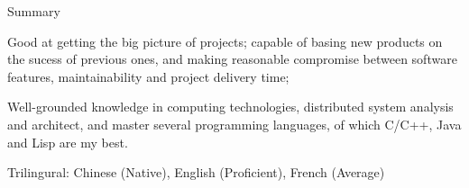 \documentclass{resume} %
\begin{document}
\begin{rSection}{Summary}

\item Good at getting the big picture of projects; capable of basing new products on the sucess of previous ones,
 and making reasonable compromise between software features,
maintainability and project delivery time;
\item Well-grounded knowledge in computing technologies, distributed system analysis and architect,
 and master several programming languages, of which C/C++, Java and Lisp are my best.
\item Trilingural: Chinese (Native), English (Proficient), French (Average)
\end{rSection}





\end{document}
